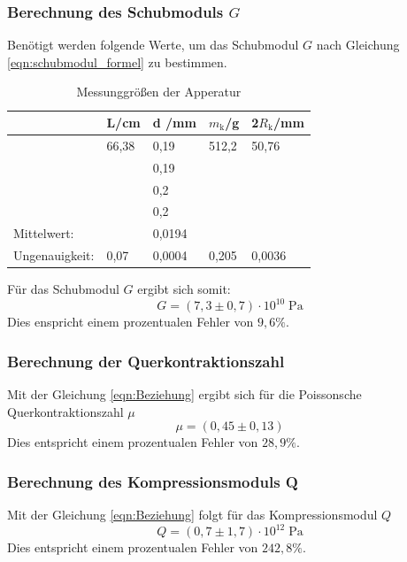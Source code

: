 \newpage
\subsubsection{Berechnung des Schubmoduls $G$}
Benötigt werden folgende Werte, um das Schubmodul $G$ nach Gleichung \ref{eqn:schubmodul_formel}
zu bestimmen.
\begin{table}
    \centering
    \label{tab:tabelle_1}
    \begin{tabular}{p{3cm} | p{1.5cm} | p{1.5cm} | p{1.5cm} | p{1.5cm}}
    \toprule
    & L\;/\;cm & d \;/\;mm & $m_\text{k}$\;/\;g & 2$R_\text{k}$\;/\;mm\\
    \midrule
    & 66,38 & 0,19 & 512,2 &  50,76 \\
    &      & 0,19 &       &        \\    
    &      & 0,2  &       &        \\
    &      & 0,2  &       &        \\
    \midrule
    Mittelwert:    &      & 0,0194 &       &        \\
    Ungenauigkeit: & 0,07 & 0,0004 & 0,205 & 0,0036 \\
    \bottomrule
    \end{tabular}
    \caption{Messunggrößen der Apperatur}
    \label{tab:tabelle_2}
\end{table}

Für das Schubmodul $G$ ergibt sich somit:
\begin{equation*}
    G = (7,3 \pm 0,7 )\cdot 10^{10}\;\mathrm{Pa}
\end{equation*}
Dies enspricht einem prozentualen Fehler von $9,6\%$.

\subsubsection{Berechnung der Querkontraktionszahl}
Mit der Gleichung \ref{eqn:Beziehung} ergibt sich für die Poissonsche Querkontraktionszahl $\mu$
\begin{equation*}
    \mu = (0,45 \pm 0,13) %
\end{equation*}
Dies entspricht einem prozentualen Fehler von $28,9\%$.

\subsubsection{Berechnung des Kompressionsmoduls Q}
Mit der Gleichung \ref{eqn:Beziehung} 
folgt für das Kompressionsmodul $Q$
\begin{equation*}
    Q = (0,7 \pm 1,7) \cdot 10^{12} \;\mathrm{Pa}
\end{equation*}
Dies entspricht einem prozentualen Fehler von $242,8\%$.
\newpage
